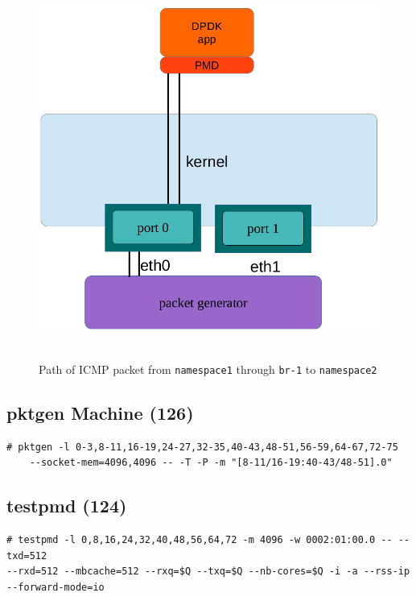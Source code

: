 \documentclass[letter]{article}
\begin{document}
{{{\begin{figure}[H]
\caption{Path of ICMP packet from \texttt{namespace1} through \texttt{br-1} to \texttt{namespace2}}
\hbox{\hspace{-0.5cm} \includegraphics[scale=0.6]{i-o-1-port} }
\end{figure}

\subsection{pktgen Machine (126)}

\begin{lstlisting}
# pktgen -l 0-3,8-11,16-19,24-27,32-35,40-43,48-51,56-59,64-67,72-75 
	--socket-mem=4096,4096 -- -T -P -m "[8-11/16-19:40-43/48-51].0"
\end{lstlisting}

\subsection{testpmd (124)}

\begin{lstlisting}[escapechar=!]
# testpmd -l 0,8,16,24,32,40,48,56,64,72 -m 4096 -w 0002:01:00.0 -- --txd=512 
--rxd=512 --mbcache=512 --rxq=$Q --txq=$Q --nb-cores=$Q -i -a --rss-ip --forward-mode=io
\end{lstlisting}

}}}
\end{document}
